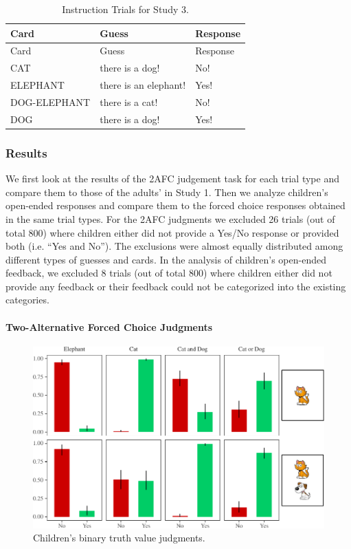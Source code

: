 \documentclass[floatsintext,man]{apa6}
\theoremstyle{definition}
\theoremstyle{definition}
\theoremstyle{definition}
\theoremstyle{remark}
\begin{document}
\begin{longtable}[]{@{}lll@{}}
\caption{\label{tab:instructionStudy3} Instruction Trials for Study
3.}\tabularnewline
\toprule
Card & Guess & Response\tabularnewline
\midrule
\endfirsthead
\toprule
Card & Guess & Response\tabularnewline
\midrule
\endhead
CAT & there is a dog! & No!\tabularnewline
ELEPHANT & there is an elephant! & Yes!\tabularnewline
DOG-ELEPHANT & there is a cat! & No!\tabularnewline
DOG & there is a dog! & Yes!\tabularnewline
\bottomrule
\end{longtable}

\subsubsection{Results}\label{results-2}

We first look at the results of the 2AFC judgement task for each trial
type and compare them to those of the adults' in Study 1. Then we
analyze children's open-ended responses and compare them to the forced
choice responses obtained in the same trial types. For the 2AFC
judgments we excluded 26 trials (out of total 800) where children either
did not provide a Yes/No response or provided both (i.e. \enquote{Yes
and No}). The exclusions were almost equally distributed among different
types of guesses and cards. In the analysis of children's open-ended
feedback, we excluded 8 trials (out of total 800) where children either
did not provide any feedback or their feedback could not be categorized
into the existing categories.

\paragraph{Two-Alternative Forced Choice
Judgments}\label{two-alternative-forced-choice-judgments}

\begin{figure}
\centering
\includegraphics{figs/Study3tvjtPlot-1.pdf}
\caption{\label{fig:Study3tvjtPlot}Children's binary truth value judgments.}
\end{figure}
\end{document}
